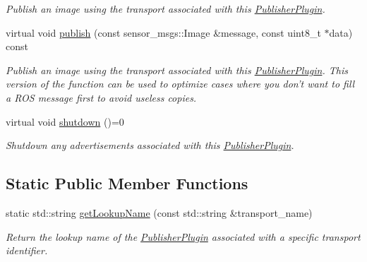\begin{DoxyCompactItemize}
\begin{DoxyCompactList}\small\item\em Publish an image using the transport associated with this \hyperlink{classimage__transport_1_1_publisher_plugin}{Publisher\-Plugin}. \end{DoxyCompactList}\item 
virtual void \hyperlink{classimage__transport_1_1_publisher_plugin_add246a58e2cc57ceba3c957f52a95a6d}{publish} (const sensor\-\_\-msgs\-::\-Image \&message, const uint8\-\_\-t $\ast$data) const 
\begin{DoxyCompactList}\small\item\em Publish an image using the transport associated with this \hyperlink{classimage__transport_1_1_publisher_plugin}{Publisher\-Plugin}. This version of the function can be used to optimize cases where you don't want to fill a R\-O\-S message first to avoid useless copies. \end{DoxyCompactList}\item 
\hypertarget{classimage__transport_1_1_publisher_plugin_aebf86857a6453919807061565f8837d2}{virtual void \hyperlink{classimage__transport_1_1_publisher_plugin_aebf86857a6453919807061565f8837d2}{shutdown} ()=0}\label{classimage__transport_1_1_publisher_plugin_aebf86857a6453919807061565f8837d2}

\begin{DoxyCompactList}\small\item\em Shutdown any advertisements associated with this \hyperlink{classimage__transport_1_1_publisher_plugin}{Publisher\-Plugin}. \end{DoxyCompactList}\end{DoxyCompactItemize}
\subsection*{Static Public Member Functions}
\begin{DoxyCompactItemize}
\item 
\hypertarget{classimage__transport_1_1_publisher_plugin_ac509e7c5ce1a6ce07870968eb1e0a0e3}{static std\-::string \hyperlink{classimage__transport_1_1_publisher_plugin_ac509e7c5ce1a6ce07870968eb1e0a0e3}{get\-Lookup\-Name} (const std\-::string \&transport\-\_\-name)}\label{classimage__transport_1_1_publisher_plugin_ac509e7c5ce1a6ce07870968eb1e0a0e3}

\begin{DoxyCompactList}\small\item\em Return the lookup name of the \hyperlink{classimage__transport_1_1_publisher_plugin}{Publisher\-Plugin} associated with a specific transport identifier. \end{DoxyCompactList}\end{DoxyCompactItemize}
